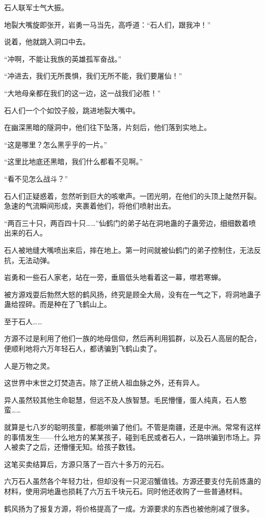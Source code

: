 \begin{this_body}
石人联军士气大振。

地裂大嘴旋即张开，岩勇一马当先，高呼道：“石人们，跟我冲！”

说着，他就跳入洞口中去。

“冲啊，不能让我族的英雄孤军奋战。”

“冲进去，我们无所畏惧，我们无所不能，我们要屠仙！”

“大地母亲都在我们的这一边，这一战我们必胜！”

石人们一个个如饺子般，跳进地裂大嘴中。

在幽深黑暗的隧洞中，他们往下坠落，片刻后，他们落到实地上。

“这是哪里？怎么黑乎乎的一片。”

“这里比地底还黑暗，我们什么都看不见啊。”

“看不见怎么战斗？”

石人们正疑惑着，忽然听到巨大的咳嗽声。一团光明，在他们的头顶上陡然开裂。急速的气流瞬间形成，夹裹着他们，将他们喷射出去。

“两百三十只，两百四十只……”仙鹤门的弟子站在洞地蛊的子蛊旁边，细细数着喷出来的石人。

石人被地缝大嘴喷出来后，摔在地上。第一时间就被仙鹤门的弟子控制住，无法反抗，无法动弹。

岩勇和一些石人家老，站在一旁，垂眉低头地看着这一幕，噤若寒蝉。

被方源戏耍后勃然大怒的鹤风扬，终究是顾全大局，没有在一气之下，将洞地蛊子蛊给捏碎。而是种在了飞鹤山上。

至于石人……

方源不过是利用了他们一族的地母信仰，然后再利用狐群，以及石人高层的配合，便顺利地将六万年轻石人，都诱骗到飞鹤山卖了。

人是万物之灵。

这世界中末世之灯焚造吉。除了正统人祖血脉之外，还有异人。

异人虽然较其他生命聪慧，但远不及人族智慧。毛民懵懂，蛋人纯真，石人憨蛮……

就算是七八岁的聪明孩童，都能哄骗了他们。不管是南疆，还是中洲。常常有这样的事情发生——什么地方的某某孩子，碰到毛民或者石人，一路哄骗到市场上。异人被卖了之后，还懵懂无知。给孩子数钱。

这笔买卖结算后，方源只落了一百六十多万的元石。

六万石人虽然各个年轻力壮，但却没有一只泥沼蟹值钱。方源还要支付先前炼蛊的材料，使用洞地蛊也损耗了六万五千块元石。同时他还收购了一些普通材料。

鹤风扬为了报复方源，将价格提高了一成。方源要求的东西也被他削减了很多。


\end{this_body}
